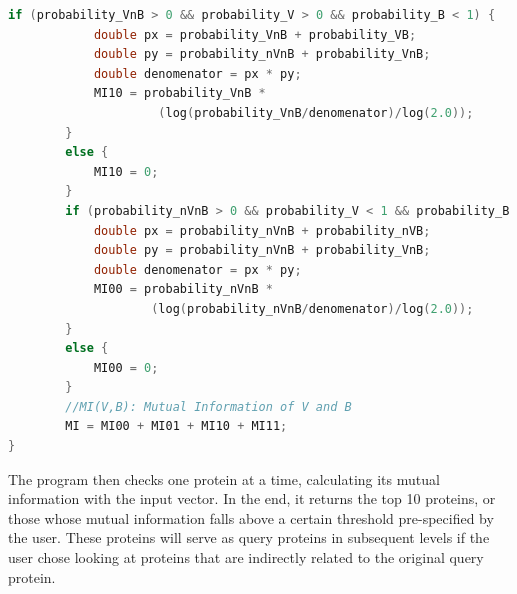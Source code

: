 \documentclass{ucetd}
\begin{document}
\begin{appendices}
\begin{lstlisting}[language=C]
        if (probability_VnB > 0 && probability_V > 0 && probability_B < 1) {
            double px = probability_VnB + probability_VB;
            double py = probability_nVnB + probability_VnB;
            double denomenator = px * py;
            MI10 = probability_VnB *
            		 (log(probability_VnB/denomenator)/log(2.0));
        }
        else {
            MI10 = 0;
        }
        if (probability_nVnB > 0 && probability_V < 1 && probability_B < 1) {
            double px = probability_nVnB + probability_nVB;
            double py = probability_nVnB + probability_VnB;
            double denomenator = px * py;
            MI00 = probability_nVnB * 
            		(log(probability_nVnB/denomenator)/log(2.0));
        }
        else {
            MI00 = 0;
        }
        //MI(V,B): Mutual Information of V and B
        MI = MI00 + MI01 + MI10 + MI11; 
}
\end{lstlisting}
The program then checks one protein at a time, calculating its mutual information with the input vector. In the end, it returns the top 10 proteins, or those whose mutual information falls above a certain threshold pre-specified by the user. These proteins will serve as query proteins in subsequent levels if the user chose looking at proteins that are indirectly related to the original query protein. 

\end{appendices}


	

%
%
\end{document}
